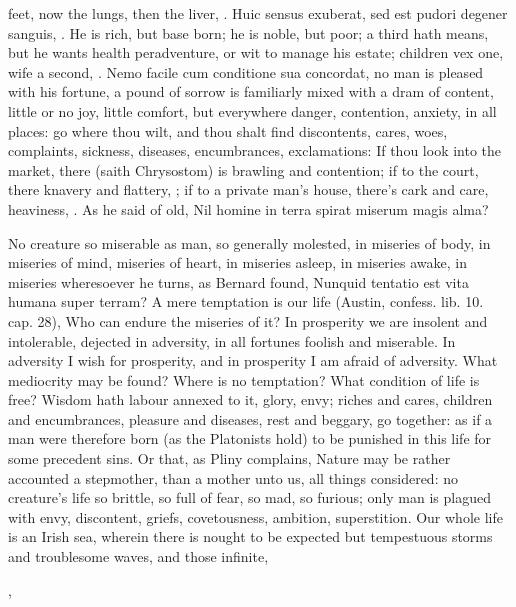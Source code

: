 {feet, now the lungs, then the liver, \etc{}. Huic sensus exuberat, sed est
pudori degener sanguis, \etc{}. He is rich, but base born; he is noble, but
poor; a third hath means, but he wants health peradventure, or wit to
manage his estate; children vex one, wife a second, \etc{}. Nemo facile cum
conditione sua concordat, no man is pleased with his fortune, a pound
of sorrow is familiarly mixed with a dram of content, little or no joy,
little comfort, but everywhere danger, contention, anxiety, in
all places: go where thou wilt, and thou shalt find discontents, cares,
woes, complaints, sickness, diseases, encumbrances, exclamations: If
thou look into the market, there (saith  Chrysostom) is brawling
and contention; if to the court, there knavery and flattery, \etc{}; if to
a private man's house, there's cark and care, heaviness, \etc{}. As he said
of old,
Nil homine in terra spirat miserum magis alma?

No creature so miserable as man, so generally molested, in
miseries of body, in miseries of mind, miseries of heart, in miseries
asleep, in miseries awake, in miseries wheresoever he turns, as Bernard
found, Nunquid tentatio est vita humana super terram? A mere temptation
is our life (Austin, confess. lib. 10. cap. 28),  Who can endure
the miseries of it? In prosperity we are insolent and
intolerable, dejected in adversity, in all fortunes foolish and
miserable. In adversity I wish for prosperity, and in prosperity
I am afraid of adversity. What mediocrity may be found? Where is no
temptation? What condition of life is free? Wisdom hath labour
annexed to it, glory, envy; riches and cares, children and
encumbrances, pleasure and diseases, rest and beggary, go together: as
if a man were therefore born (as the Platonists hold) to be punished in
this life for some precedent sins. Or that, as Pliny complains,
Nature may be rather accounted a stepmother, than a mother unto us, all
things considered: no creature's life so brittle, so full of fear, so
mad, so furious; only man is plagued with envy, discontent, griefs,
covetousness, ambition, superstition. Our whole life is an Irish sea,
wherein there is nought to be expected but tempestuous storms and
troublesome waves, and those infinite,

,

}
